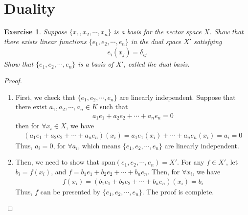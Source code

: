 \documentclass[11pt]{book}
\newtheorem{exercise}{Exercise}[section]
\theoremstyle{definition}
\numberwithin{equation}{chapter}
\begin{document}
\section{Duality}
\begin{exercise}
Suppose $\{x_1, x_2,\cdots, x_n\}$ is a basis for the vector space $X$. Show that there exists linear functions $\{e_1, e_2,\cdots, e_n\}$ in the dual space $X'$ satisfying 
\begin{align*}
    e_i(x_j) = \delta_{ij}
\end{align*}
Show that $\{e_1, e_2,\cdots, e_n\}$ is a basis of $X'$, called the dual basis.
\end{exercise}
\begin{proof}
~\begin{enumerate}[label=(\alph*)]
    \item First, we check that $\{e_1, e_2, \cdots, e_n\}$ are linearly independent. Suppose that there exist  $a_1, a_2, \cdots, a_n \in K$ such that 
    \begin{align*}
        a_1 e_1 + a_2 e_2 + \cdots + a_n e_n = 0
    \end{align*}
    then for $\forall x_i \in X$, we have
    \begin{align*}
        (a_1 e_1 + a_2 e_2 + \cdots + a_n e_n)(x_i) = a_1 e_1(x_i) + \cdots + a_n e_n(x_i) = a_i = 0
    \end{align*}
    Thus, $a_i = 0$, for $\forall a_i$, which means $\{e_1, e_2, \cdots, e_n\}$ are linearly independent.
    \item Then, we need to show that span$(e_1, e_2, \cdots, e_n) = X'$. For any $f \in X'$, let $b_i  = f(x_i)$, and $f = b_1 e_1 + b_2 e_2 + \cdots + b_n e_n$. Then, for $\forall x_i$, we have
    \begin{align*}
        f(x_i) = (b_1 e_1 + b_2 e_2 + \cdots + b_n e_n)(x_i) = b_i
    \end{align*}
    Thus, $f$ can be presented by $\{e_1, e_2, \cdots, e_n\}$. The proof is complete.
\end{enumerate}
\end{proof}

\medskip
\end{document}
